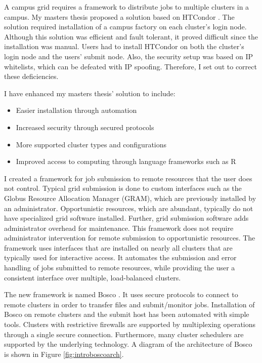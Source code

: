 A campus grid requires a framework to distribute jobs to multiple clusters in a campus.  My masters thesis \cite{weitzel2011campus} proposed a solution based on HTCondor \cite{litzkow1988condor}.  The solution required installation of a campus factory \cite{website:campusfactory} on each cluster's login node.  Although this solution was efficient and fault tolerant, it proved difficult since the installation was manual.  Users had to install HTCondor on both the cluster's login node and the users' submit node.  Also, the security setup was based on IP whitelists, which can be defeated with IP spoofing.  Therefore, I set out to correct these deficiencies.

I have enhanced my masters thesis' solution to include:
\begin{itemize}
\item Easier installation through automation
\item Increased security through secured protocols
\item More supported cluster types and configurations
\item Improved access to computing through language frameworks such as R \cite{team2005r}
\end{itemize}

I created a framework for job submission to remote resources that the user does not control.  Typical grid submission is done to custom interfaces such as the Globus Resource Allocation Manager \cite{foster1999globus} (GRAM), which are previously installed by an administrator.  Opportunistic resources, which are abundant, typically do not have specialized grid software installed.  Further, grid submission software adds administrator overhead for maintenance.  This framework does not require administrator intervention for remote submission to opportunistic resources.  The framework uses interfaces that are installed on nearly all clusters that are typically used for interactive access.  It automates the submission and error handling of jobs submitted to remote resources, while providing the user a consistent interface over multiple, load-balanced clusters.

The new framework is named Bosco \cite{chep2013weitzel}.  It uses secure protocols to connect to remote clusters in order to transfer files and submit/monitor jobs.  Installation of Bosco on remote clusters and the submit host has been automated with simple tools.  Clusters with restrictive firewalls are supported by multiplexing operations through a single secure connection.  Furthermore, many cluster schedulers are supported by the underlying technology.  A diagram of the architecture of Bosco is shown in Figure \ref{fig:introboscoarch}.

